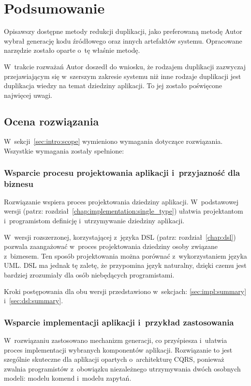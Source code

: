 \chapter{Podsumowanie} \label{chap:outro}

Opisawszy dostępne metody redukcji duplikacji, jako preferowaną metodę Autor wybrał generację kodu źródłowego oraz innych artefaktów systemu.
Opracowane narzędzie zostało oparte o~tę właśnie metodę.

W~trakcie rozważań Autor doszedł do wniosku, że rodzajem duplikacji zazwyczaj przejawiającym się w~szerszym zakresie systemu niż inne rodzaje duplikacji jest duplikacja wiedzy na temat dziedziny aplikacji.
To jej zostało poświęcone najwięcej uwagi.



\section{Ocena rozwiązania}

W~sekcji~\ref{sec:intro:scope} wymieniono wymagania dotyczące rozwiązania.
Wszystkie wymagania zostały spełnione:


\subsection{Wsparcie procesu projektowania aplikacji i~przyjazność dla biznesu}

Rozwiązanie wspiera proces projektowania dziedziny aplikacji.
W~podstawowej wersji (patrz: rozdział~\ref{chap:implementation:single_type}) ułatwia projektantom i~programistom definicję i~utrzymywanie dziedziny aplikacji.

W~wersji rozszerzonej, korzystającej z~języka DSL (patrz: rozdział~\ref{chap:dsl}) pozwala zaangażować w~proces projektowania dziedziny osoby związane z~biznesem.
Ten sposób projektowania można porównać z~wykorzystaniem języka UML.
DSL ma jednak tę zaletę, że przypomina język naturalny, dzięki czemu jest bardziej zrozumiały dla osób niebędących programistami.

Kroki postępowania dla obu wersji przedstawiono w~sekcjach: \ref{sec:impl:summary} i~\ref{sec:dsl:summary}.


\subsection{Wsparcie implementacji aplikacji i~przykład zastosowania}

W~rozwiązaniu zastosowano mechanizm generacji, co przyśpiesza i~ułatwia proces implementacji wybranych komponentów aplikacji.
Rozwiązanie to jest szególnie skuteczne dla aplikacji opartych o~architekturę CQRS, ponieważ zwalnia programistów z~obowiązku niezależnego utrzymywania dwóch osobnych modeli: modelu komend i~modelu zapytań.

